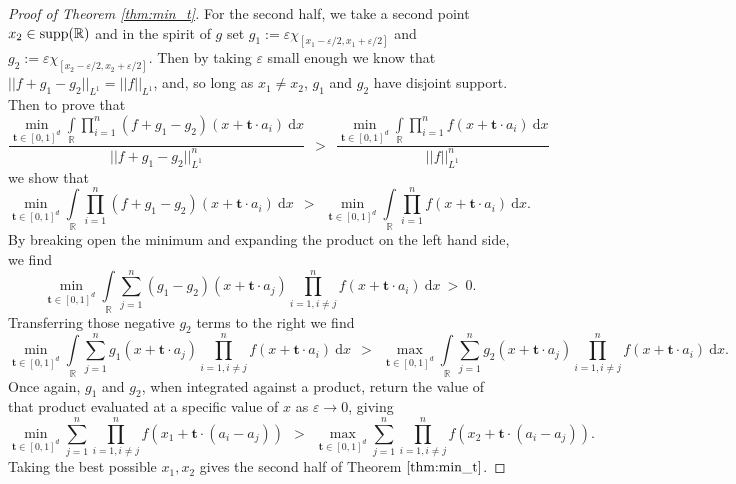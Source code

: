 \documentclass[11pt,reqno]{amsart}
\numberwithin{equation}{section}
\theoremstyle{plain}
\newcommand{\R}{\ensuremath{\mathbb{R}}}
\newcommand{\e}{\varepsilon}
\begin{document}
\begin{proof}[Proof of Theorem \ref{thm:min_t}]
For the second half, we take a second point $x_2 \in {\rm supp}(\R)$ and in the spirit of $g$ set $g_1 := \e \chi_{[x_1-\e/2,x_1+\e/2]}$ and $g_2 := \e \chi_{[x_2-\e/2,x_2+\e/2]}$. Then by taking $\e$ small enough we know that $||f+g_1-g_2||_{L^1}=||f||_{L^1}$, and, so long as $x_1 \neq x_2$, $g_1$ and $g_2$ have disjoint support. Then to prove that
\begin{equation}
    \frac{\min\limits_{\mathbf{t}\in[0,1]^d}\displaystyle\int\limits_{\R}\prod\limits_{i=1}^{n}(f+g_1-g_2)(x+\mathbf{t}\cdot a_i)\ \mathrm{d}x}{||f+g_1-g_2||_{L^1}^{n}}\ \ > \ \  \frac{\min\limits_{\mathbf{t}\in[0,1]^d}\displaystyle\int\limits_{\R}\prod\limits_{i=1}^{n}f(x+\mathbf{t}\cdot a_i)\ \mathrm{d}x}{||f||_{L^1}^{n}}
\end{equation}
we show that
\begin{equation}
    \min\limits_{\mathbf{t}\in[0,1]^d}\displaystyle\int\limits_{\R}\prod\limits_{i=1}^{n}(f+g_1-g_2)(x+\mathbf{t}\cdot a_i)\ \mathrm{d}x\ \ > \ \  \min\limits_{\mathbf{t}\in[0,1]^d}\displaystyle\int\limits_{\R}\prod\limits_{i=1}^{n}f(x+\mathbf{t}\cdot a_i)\ \mathrm{d}x.
\end{equation}
By breaking open the minimum and expanding the product on the left hand side, we find
\begin{equation}
    \min\limits_{\mathbf{t}\in[0,1]^d}\int\limits_{\R}\sum\limits_{j=1}^n (g_1-g_2)(x+\mathbf{t}\cdot a_j)\prod\limits_{i=1,i\neq j}^{n}f(x+\mathbf{t}\cdot a_i)\ \mathrm{d}x\ >\ 0.
\end{equation}
Transferring those negative $g_2$ terms to the right we find
\begin{equation}
    \min\limits_{\mathbf{t}\in[0,1]^d}\int\limits_{\R}\sum\limits_{j=1}^n g_1(x+\mathbf{t}\cdot a_j)\prod\limits_{i=1,i\neq j}^{n}f(x+\mathbf{t}\cdot a_i)\ \mathrm{d}x\ \ > \ \  \max\limits_{\mathbf{t}\in[0,1]^d}\int\limits_{\R}\sum\limits_{j=1}^n g_2(x+\mathbf{t}\cdot a_j)\prod\limits_{i=1,i\neq j}^{n}f(x+\mathbf{t}\cdot a_i)\ \mathrm{d}x.
\end{equation}
Once again, $g_1$ and $g_2$, when integrated against a product, return the value of that product evaluated at a specific value of $x$ as $\e \to 0$, giving
\begin{equation}
    \min\limits_{\mathbf{t}\in[0,1]^d}\sum\limits_{j=1}^n \prod\limits_{i=1,i\neq j}^{n}f(x_1+\mathbf{t}\cdot (a_i-a_j))\ \ > \ \  \max\limits_{\mathbf{t}\in[0,1]^d}\sum\limits_{j=1}^n \prod\limits_{i=1,i\neq j}^{n}f(x_2+\mathbf{t}\cdot (a_i-a_j)).
\end{equation}
Taking the best possible $x_1,x_2$ gives the second half of Theorem $\ref{thm:min_t}$.
\end{proof}
\end{document}
